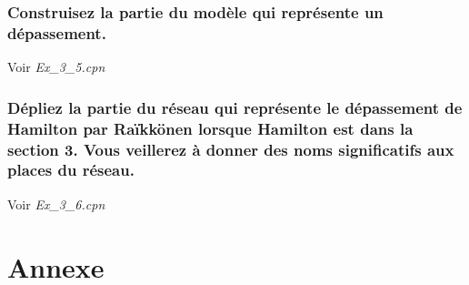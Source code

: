 \documentclass[french]{article}
\begin{document}
\subsubsection{Construisez la partie du modèle qui
  représente un dépassement.}
Voir \textit{Ex\_3\_5.cpn} \\
\subsubsection{Dépliez la partie du réseau qui représente le dépassement de Hamilton par Raïkkönen lorsque Hamilton est dans
  la section 3. Vous veillerez à donner des noms significatifs aux places du réseau.}
Voir \textit{Ex\_3\_6.cpn} \\

\newpage
\section{Annexe}

\end{document}
